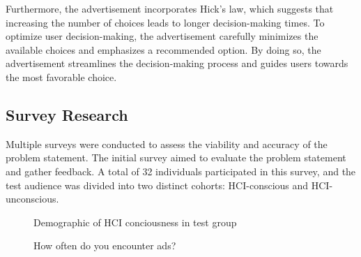 \documentclass[journal]{IEEEtran}
\begin{document}
Furthermore, the advertisement incorporates Hick's law, which suggests that increasing the
number of choices leads to longer decision-making times. To optimize user decision-making,
the advertisement carefully minimizes the available choices and emphasizes a recommended
option. By doing so, the advertisement streamlines the decision-making process and guides
users towards the most favorable choice.

\subsection{Survey Research}
Multiple surveys were conducted to assess the viability and accuracy of the problem statement.
The initial survey aimed to evaluate the problem statement and gather feedback. A total of
32 individuals participated in this survey, and the test audience was divided into two
distinct cohorts: HCI-conscious and HCI-unconscious.



\begin{figure}[ht]
    \centering
    \caption{Demographic of HCI conciousness in test group}
\end{figure}

\begin{figure}[ht]
    \centering
    \caption{How often do you encounter ads?}
\end{figure}
\end{document}
